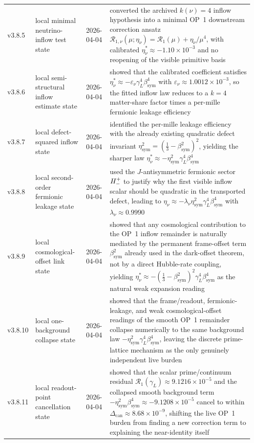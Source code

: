 {\begin{longtable}{|p{}|p{}|p{}|p{}|}
v3.8.5 & local minimal neutrino-inflow test state & 2026-04-04 & converted the archived \(k(\nu)=4\) inflow hypothesis into a minimal OP~1 downstream correction ansatz \(\mathcal R_{1,\nu}(\mu;\eta_\nu)=\mathcal R_1(\mu)+\eta_\nu/\mu^4\), with calibrated \(\eta_\nu^\ast\approx -1.10\times10^{-3}\) and no reopening of the visible primitive basis \\
v3.8.6 & local semi-structural inflow estimate state & 2026-04-04 & showed that the calibrated coefficient satisfies \(\eta_\nu^\ast\approx -\varepsilon_\nu\gamma_L^4\beta_{\mathrm{sym}}^4\) with \(\varepsilon_\nu\approx 1.0012\times10^{-3}\), so the fitted inflow law reduces to a \(k=4\) matter-share factor times a per-mille fermionic leakage efficiency \\
v3.8.7 & local defect-squared inflow state & 2026-04-04 & identified the per-mille leakage efficiency with the already existing quadratic defect invariant \(\eta_{\mathrm{sym}}^2=(\frac13-\beta_{\mathrm{sym}}^2)^2\), yielding the sharper law \(\eta_\nu^\ast\approx -\eta_{\mathrm{sym}}^2\gamma_L^4\beta_{\mathrm{sym}}^4\) \\
v3.8.8 & local second-order fermionic leakage state & 2026-04-04 & used the \(J\)-antisymmetric fermionic sector \(H^+_-\) to justify why the first visible inflow scalar should be quadratic in the transported defect, leading to \(\eta_\nu\approx -\lambda_\nu\eta_{\mathrm{sym}}^2\gamma_L^4\beta_{\mathrm{sym}}^4\) with \(\lambda_\nu\approx 0.9990\) \\
v3.8.9 & local cosmological-offset link state & 2026-04-04 & showed that any cosmological contribution to the OP~1 inflow remainder is naturally mediated by the permanent frame-offset term \(\beta_{\mathrm{sym}}^2\) already used in the dark-offset theorem, not by a direct Hubble-rate coupling, yielding \(\eta_\nu^\ast\approx -(\frac13-\beta_{\mathrm{sym}}^2)^2\gamma_L^4\beta_{\mathrm{sym}}^4\) as the natural weak expansion reading \\
v3.8.10 & local one-background collapse state & 2026-04-04 & showed that the frame/readout, fermionic-leakage, and weak cosmological-offset readings of the smooth OP~1 remainder collapse numerically to the same background law \(-\eta_{\mathrm{sym}}^2\gamma_L^4\beta_{\mathrm{sym}}^4\), leaving the discrete prime-lattice mechanism as the only genuinely independent live burden \\
v3.8.11 & local readout-point cancellation state & 2026-04-04 & showed that the scalar prime/continuum residual \(\mathcal R_1(\gamma_L)\approx 9.1216\times10^{-5}\) and the collapsed smooth background term \(-\eta_{\mathrm{sym}}^2\beta_{\mathrm{sym}}^4\approx -9.1208\times10^{-5}\) cancel to within \(\Delta_{\mathrm{can}}\approx 8.68\times10^{-9}\), shifting the live OP~1 burden from finding a new correction term to explaining the near-identity itself \\

\end{longtable}}
